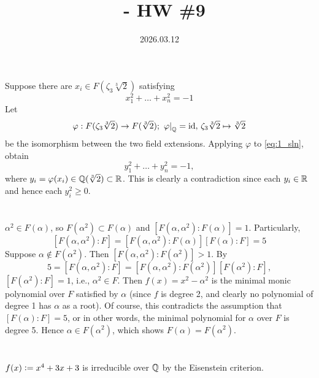 \documentclass[12pt]{article}
\title{\course\ - HW \#9}
\author{\myname}
\date{2026.03.12}
\begin{document}
\maketitle
\thispagestyle{fancy}


\section{}
Suppose there are $x_i \in F(\zeta_3 \sqrt[3]{2})$ satisfying 
\begin{equation} \label{eq:1_sln}
  x_{1}^{2} + \ldots + x_{n}^{2} = -1
\end{equation}
Let 
$$\varphi: F(\zeta_3 \sqrt[3]{2}) \rightarrow F(\sqrt[3]{2}); \: \left. \varphi \right|_{\mathbb{Q}} = \text{id}, \, \zeta_3 \sqrt[3]{2} \mapsto \sqrt[3]{2}$$ 
be the isomorphism between the two field extensions. 
Applying $\varphi$ to \eqref{eq:1_sln}, obtain 
$$y_{1}^{2} + \ldots + y_{n}^{2} = -1,$$ 
where $y_i = \varphi(x_i) \in \mathbb{Q}(\sqrt[3]{2}) \subset \mathbb{R}$. 
This is clearly a contradiction since each $y_i \in \mathbb{R}$ and hence each $y_{i}^{2} \geq 0$. 

\section{} 
$\alpha^2 \in F(\alpha)$, so $F(\alpha^2) \subset F(\alpha)$ and $[F(\alpha, \alpha^2) : F(\alpha)] = 1$. 
Particularly, 
$$[F(\alpha, \alpha^2) : F] = [F(\alpha, \alpha^2) : F(\alpha)] [F(\alpha) : F] = 5$$ 
Suppose $\alpha \notin F(\alpha^2)$. 
Then $[F(\alpha, \alpha^2) : F(\alpha^2)] > 1$. 
By 
$$5 = [F(\alpha, \alpha^2) : F] = [F(\alpha, \alpha^2) : F(\alpha^2)] [F(\alpha^2) : F],$$ 
$[F(\alpha^2) : F] = 1$, i.e., $\alpha^2 \in F$.  
Then $f(x) = x^2 - \alpha^2$ is the minimal monic polynomial over $F$ satisfied by $\alpha$ (since $f$ is degree 2, and clearly no polynomial of degree 1 has $\alpha$ as a root).   
Of course, this contradicts the assumption that $[F(\alpha) : F] = 5$, or in other words, the minimal polynomial for $\alpha$ over $F$ is degree 5. 
Hence $\alpha \in F(\alpha^2)$, which shows $F(\alpha) = F(\alpha^2)$. 

\newcommand{\fieldK}{\Q(\sqrt[3]{2})}
\section{}
$f(x) \vcentcolon= x^4 + 3x + 3$ is irreducible over $\mathbb{Q}$ by the Eisenstein criterion. 
\end{document}
